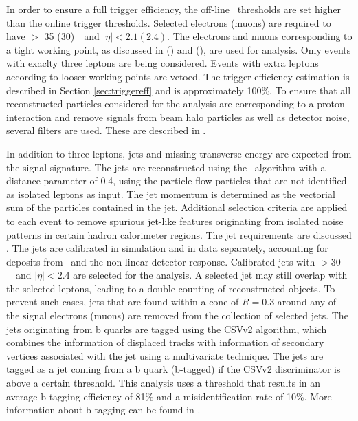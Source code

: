 In order to ensure a full trigger efficiency, the off-line \pt\ thresholds are set higher than the online trigger thresholds. 
Selected electrons (muons) are required to have \pt $>$ 35 (30)~\GeV\ and $|\eta| < 2.1 (2.4)$. The electrons and muons corresponding to a tight working point, as discussed in  () and  (), are used for analysis. Only events with exaclty three leptons are being considered. Events with extra leptons according to looser working points are vetoed. The trigger efficiency estimation is described in Section \ref{sec:triggereff} and is approximately 100\%. To ensure that all reconstructed particles considered for the analysis are corresponding to a proton interaction and remove signals from beam halo particles as well as detector noise, several filters are used. These are described in .

In addition to three leptons, jets and missing transverse energy are expected from the signal signature. The jets are reconstructed using the \antikt\ algorithm with a distance parameter of 0.4, using the particle flow particles that are not identified as isolated leptons as input. The jet momentum is determined as the vectorial sum of the particles contained in the jet. Additional selection criteria are applied to each event to remove spurious jet-like features originating from isolated noise patterns in certain hadron calorimeter regions. The jet requirements are discussed . The jets are calibrated in simulation and in data separately, accounting for deposits from \pu\ and the non-linear detector response. Calibrated jets with \pt $> 30$~\GeV\ and $|\eta| < 2.4$ are selected for the analysis.  A selected jet may still overlap with the selected leptons, leading to a double-counting of reconstructed objects. To prevent such cases, jets that are found within a cone of  $R = 0.3$ around any of the signal electrons (muons) are removed from the collection of selected jets. The jets originating from b quarks are tagged using the CSVv2 algorithm, which combines the information of displaced tracks with information of secondary vertices associated with the jet using a multivariate technique. The jets are tagged as a jet coming from a b quark (b-tagged) if the CSVv2 discriminator is above a certain threshold.  This analysis uses a threshold that results in an average b-tagging efficiency of 81\% and a misidentification rate of 10\%. More information about b-tagging can be found in .

